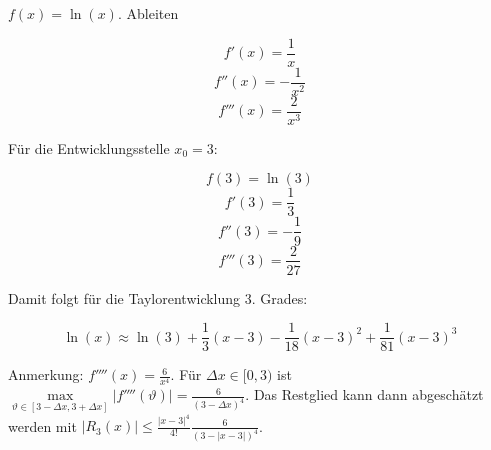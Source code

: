\item $f(x) = \ln(x)$. Ableiten

$$f'(x) = \frac{1}{x}$$
$$f''(x) = -\frac{1}{x^2}$$
$$f'''(x) = \frac{2}{x^3}$$

Für die Entwicklungsstelle $x_0 = 3$:

$$f(3) = \ln(3)$$
$$f'(3) = \frac{1}{3}$$
$$f''(3) = -\frac{1}{9}$$
$$f'''(3) = \frac{2}{27}$$

Damit folgt für die Taylorentwicklung 3. Grades:

$$\ln(x) \approx \ln(3) + \frac{1}{3} (x-3) - \frac{1}{18} (x-3)^2 + \frac{1}{81} (x-3)^3$$

Anmerkung: $f''''(x)=\frac{6}{x^4}$. Für $\Delta x \in [0,3)$ ist $\max\limits_{\vartheta\in[3-\Delta x,3+\Delta x]}|f''''(\vartheta)| = \frac{6}{(3-\Delta x)^4}$. Das Restglied kann dann abgeschätzt werden mit $|R_3(x)| \leq \frac{|x-3|^4}{4!} \frac{6}{(3-|x-3|)^4}$.

